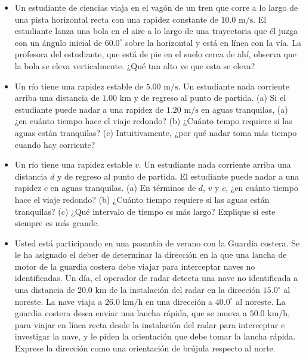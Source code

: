 \documentclass[11pt,a4paper]{article}
\begin{document}
\newpage

\begin{itemize}
    \item[\textbf{29.}] Un estudiante de ciencias viaja en el vagón de un tren que corre a lo largo de una pista horizontal recta con una rapidez constante de $10.0 \text{ m/s}$. El estudiante lanza una bola en el aire a lo largo de una trayectoria que él juzga con un ángulo inicial de $60.0^\circ$ sobre la horizontal y está en línea con la vía. La profesora del estudiante, que está de pie en el suelo cerca de ahí, observa que la bola se eleva verticalmente. ¿Qué tan alto ve que esta se eleva?
    \vspace*{6cm}

    \item[\textbf{30.}] Un río tiene una rapidez estable de $5.00 \text{ m/s}$. Un estudiante nada corriente arriba una distancia de $1.00 \text{ km}$ y de regreso al punto de partida. (a) Si el estudiante puede nadar a una rapidez de $1.20 \text{ m/s}$ en aguas tranquilas, (a) ¿en cuánto tiempo hace el viaje redondo? (b) ¿Cuánto tempo requiere si las aguas están tranquilas? (c) Intuitivamente, ¿por qué nadar toma más tiempo cuando hay corriente?
    \vspace*{7cm}

    \item[\textbf{31.}] Un río tiene una rapidez estable $v$. Un estudiante nada corriente arriba una distancia $d$ y de regreso al punto de partida. El estudiante puede nadar a una rapidez $c$ en aguas tranquilas. (a) En términos de $d$, $v$ y $c$, ¿en cuánto tiempo hace el viaje redondo? (b) ¿Cuánto tiempo requiere si las aguas están tranquilas? (c) ¿Qué intervalo de tiempo es más largo? Explique si este siempre es más grande.
    \vspace*{7cm}

    \item[\textbf{32.}] Usted está participando en una pasantía de verano con la Guardia costera. Se le ha asignado el deber de determinar la dirección en la que una lancha de motor de la guardia costera debe viajar para interceptar naves no identificadas. Un día, el operador de radar detecta una nave no identificada a una distancia de $20.0 \text{ km}$ de la instalación del radar en la dirección $15.0^\circ$ al noreste. La nave viaja a $26.0 \text{ km/h}$ en una dirección a $40.0^\circ$ al noreste. La guardia costera desea enviar una lancha rápida, que se mueva a $50.0 \text{ km/h}$, para viajar en línea recta desde la instalación del radar para interceptar e investigar la nave, y le piden la orientación que debe tomar la lancha rápida. Exprese la dirección como una orientación de brújula respecto al norte.
    \vspace*{7cm}


\end{itemize}
\end{document}
